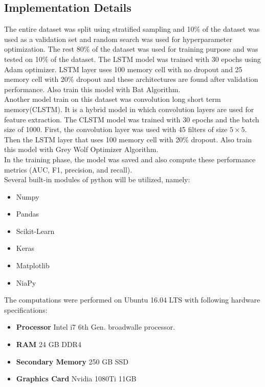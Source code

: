 \documentclass[12pt,a4paper]{article}
\begin{document}
\subsection{Implementation Details}
The entire dataset was split using stratified sampling and 10\% of the dataset was used as a validation set and random search was used for hyperparameter optimization. The rest 80\% of the dataset was used for training purpose and was tested on 10\% of the dataset. The LSTM model was trained with 30 epochs using Adam optimizer. LSTM layer uses 100 memory cell with no dropout and 25 memory cell with 20\% dropout and these architectures are found after validation performance. Also train this model with Bat Algorithm.
\\
Another model train on this dataset was convolution long short term memory(CLSTM). It is a hybrid model in which convolution layers are used for feature extraction. The CLSTM model was trained with 30 epochs and the batch size of 1000. First, the convolution layer was used with 45 filters of size $5\times5$. Then the LSTM layer that uses 100 memory cell with 20\% dropout. Also train this model with Grey Wolf Optimizer Algorithm.\\
In the training phase, the model was saved and also compute these performance metrics (AUC, F1, precision, and recall).\\
Several built-in modules of python will be utilized, namely:
\begin{itemize}
    \item Numpy
    \item Pandas
    \item Scikit-Learn
    \item Keras
    \item Matplotlib
    \item NiaPy
\end{itemize}
The computations were performed on Ubuntu 16.04 LTS with following hardware specifications:
\begin{itemize}
    \item \textbf{Processor} Intel i7 6th Gen. broadwalle processor.
    \item \textbf{RAM} 24 GB DDR4
    \item \textbf{Secondary Memory} 250 GB SSD
    \item \textbf{Graphics Card} Nvidia 1080Ti 11GB
\end{itemize}
\end{document}
